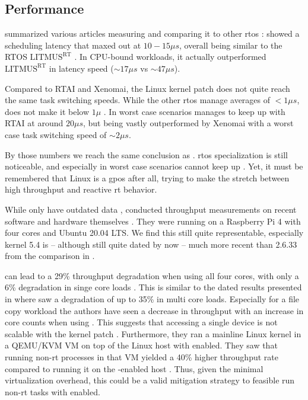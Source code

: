 \documentclass[10pt,twocolumn,a4paper]{article}
\begin{document}
\subsection{Performance}
\citeauthor{reghenzani_realtime_2019} summarized various articles measuring  and comparing it to other \acrshort{rtos} \cite{reghenzani_realtime_2019}:
 showed a scheduling latency that maxed out at $10 - 15\mu s$, overall being similar to the RTOS $\text{LITMUS}^{\text{RT}}$ \cite{litmusrt}.
In CPU-bound workloads, it actually outperformed $\text{LITMUS}^{\text{RT}}$ in latency speed ($\sim 17\mu s$ vs $\sim 47\mu s$).

Compared to RTAI and Xenomai, the Linux kernel patch does not quite reach the same task switching speeds.
While the other \acrshort{rtos} manage averages of $<1\mu s$,  does not make it below $1 \mu$ \cite{reghenzani_realtime_2019}.
In worst case scenarios  manages to keep up with RTAI at around $20\mu s$, but being vastly outperformed by Xenomai with a worst case task switching speed of $\sim 2\mu s$.

By those numbers we reach the same conclusion as \cite{reghenzani_realtime_2019}.
\acrshort{rtos} specialization is still noticeable, and especially in worst case scenarios  cannot keep up \cite{reghenzani_realtime_2019}.
Yet, it must be remembered that Linux is a \acrfull{gpos} after all, trying to make the stretch between high throughput and reactive \acrshort{rt} behavior.

While \citeauthor{reghenzani_realtime_2019} only have outdated data \cite{reghenzani_realtime_2019}, \citeauthor{li_performance_2023} conducted throughput measurements on recent software and hardware themselves \cite{li_performance_2023}.
They were running on a Raspberry Pi 4 with four cores and Ubuntu 20.04 LTS.
We find this still quite representable, especially kernel 5.4 is -- although still quite dated by now -- much more recent than 2.6.33 from the comparison in \cite{reghenzani_realtime_2019}.

 can lead to a 29\% throughput degradation when using all four cores, with only a 6\% degradation in singe core loads \cite{li_performance_2023}.
This is similar to the dated results presented in \cite{reghenzani_realtime_2019} where \citeauthor{reghenzani_realtime_2019} saw a degradation of up to 35\% in multi core loads.
Especially for a file copy workload the authors have seen a decrease in throughput with an increase in core counts when using  \cite{li_performance_2023}.
This suggests that accessing a single device is not scalable with the kernel patch \cite{li_performance_2023}.
Furthermore, they ran a mainline Linux kernel in a QEMU/KVM VM on top of the Linux host with  enabled.
They saw that running non-\acrshort{rt} processes in that VM yielded a 40\% higher throughput rate compared to running it on the -enabled host \cite{li_performance_2023}.
Thus, given the minimal virtualization overhead, this could be a valid mitigation strategy \cite{li_performance_2023} to feasible run non-\acrshort{rt} tasks with  enabled.
\end{document}
